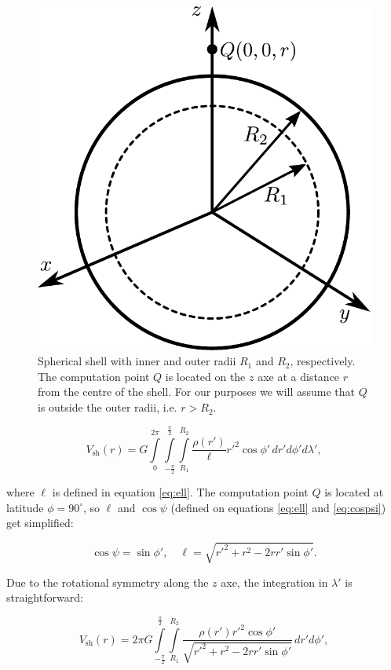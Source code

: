 \documentclass[extra]{gji}
\begin{document}
\begin{figure}
\centering
\includegraphics[width=0.7\linewidth]{figures/spherical-shell.pdf}
\caption{
    Spherical shell with inner and outer radii $R_1$ and $R_2$, respectively.
    The computation point $Q$ is located on the $z$ axe at a distance $r$ from
    the centre of the shell.
    For our purposes we will assume that $Q$ is outside the outer radii,
    i.e. $r > R_2$.
    }
\label{fig:spherical-shell}
\end{figure}

\begin{equation}
    V_\text{sh}(r) = G
    \int\limits_0^{2\pi}
    \int\limits_{-\frac{\pi}{2}}^\frac{\pi}{2}
    \int\limits_{R_1}^{R_2}
    \frac{\rho(r')}{\ell} {r'}^2 \cos\phi' \,
    dr' d\phi' d\lambda',
\end{equation}

\noindent where $\ell$ is defined in equation \ref{eq:ell}. The computation
point $Q$ is located at latitude $\phi=90^\circ$, so $\ell$ and $\cos\psi$
(defined on equations \ref{eq:ell} and \ref{eq:cospsi}) get simplified:

\begin{equation}
    \cos\psi = \sin\phi', \quad
    \ell = \sqrt{r'^2 + r^2 - 2 r r' \sin\phi'}.
\end{equation}

Due to the rotational symmetry along the $z$ axe, the integration in
$\lambda'$ is straightforward:

\begin{equation}
    V_\text{sh}(r) = 2\pi G
    \int\limits_{-\frac{\pi}{2}}^\frac{\pi}{2}
    \int\limits_{R_1}^{R_2}
    \frac{\rho(r') {r'}^2 \cos\phi'}{\sqrt{r'^2 + r^2 - 2 r r' \sin\phi'}}
    \, dr' d\phi',
\end{equation}
\end{document}
